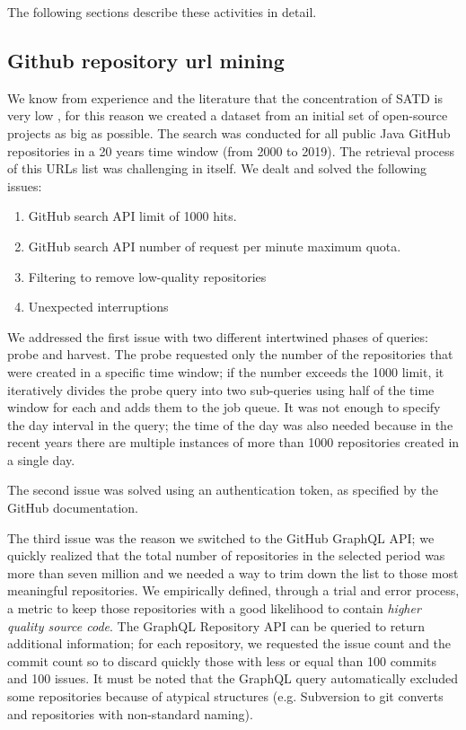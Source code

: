 The following sections describe these activities in detail.

\subsection{Github repository url mining}
We know from experience and the literature that the concentration of SATD is very low \cite{bavota2016large} \cite{maldonado2015detecting} \cite{potdar2014exploratory}, for this reason we created a dataset from an initial set of open-source projects as big as possible. 
The search was conducted for all public Java GitHub repositories in a 20 years time window (from 2000 to 2019). 
The retrieval process of this URLs list was challenging in itself. We dealt and solved the following issues:
\begin{enumerate}
    \item GitHub search API limit of 1000 hits.
    \item GitHub search API number of request per minute maximum quota.
    \item Filtering to remove low-quality repositories
    \item Unexpected interruptions
\end{enumerate}
We addressed the first issue with two different intertwined phases of queries: probe and harvest. The probe requested only the number of the repositories that were created in a specific time window; if the number exceeds the 1000 limit, it iteratively divides the probe query into two sub-queries using half of the time window for each and adds them to the job queue.
It was not enough to specify the day interval in the query; the time of the day was also needed because in the recent years there are multiple instances of more than 1000 repositories created in a single day.

The second issue was solved using an authentication token, as specified by the GitHub documentation.

The third issue was the reason we switched to the GitHub GraphQL API; we quickly realized that the total number of repositories in the selected period was more than seven million and we needed a way to trim down the list to those most meaningful repositories. We empirically defined, through a trial and error process, a metric to keep those repositories with a good likelihood to contain \textit{higher quality source code}. 
The GraphQL Repository API can be queried to return additional information; for each repository, we requested the issue count and the commit count so to discard quickly those with less or equal than 100 commits and 100 issues. It must be noted that the GraphQL query automatically excluded some repositories because of atypical structures (e.g. Subversion to git converts and repositories with non-standard naming). 

